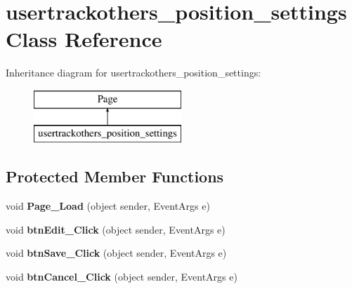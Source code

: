 \hypertarget{classusertrackothers__position__settings}{\section{usertrackothers\-\_\-position\-\_\-settings Class Reference}
\label{classusertrackothers__position__settings}
}
Inheritance diagram for usertrackothers\-\_\-position\-\_\-settings\-:\begin{figure}[H]
\begin{center}
\leavevmode
\includegraphics[height=2.000000cm]{classusertrackothers__position__settings}
\end{center}
\end{figure}
\subsection*{Protected Member Functions}
\begin{DoxyCompactItemize}
\item 
\hypertarget{classusertrackothers__position__settings_a8d16a41a67c8926bb09f5f3f149e29eb}{void {\bfseries Page\-\_\-\-Load} (object sender, Event\-Args e)}\label{classusertrackothers__position__settings_a8d16a41a67c8926bb09f5f3f149e29eb}

\item 
\hypertarget{classusertrackothers__position__settings_ab8f40e241f80bea7075fbdefe1561b5a}{void {\bfseries btn\-Edit\-\_\-\-Click} (object sender, Event\-Args e)}\label{classusertrackothers__position__settings_ab8f40e241f80bea7075fbdefe1561b5a}

\item 
\hypertarget{classusertrackothers__position__settings_af041fe3909a24b111515be9abbd27661}{void {\bfseries btn\-Save\-\_\-\-Click} (object sender, Event\-Args e)}\label{classusertrackothers__position__settings_af041fe3909a24b111515be9abbd27661}

\item 
\hypertarget{classusertrackothers__position__settings_aacdba5826f6038282aa673f9ffc87dfc}{void {\bfseries btn\-Cancel\-\_\-\-Click} (object sender, Event\-Args e)}\label{classusertrackothers__position__settings_aacdba5826f6038282aa673f9ffc87dfc}

\end{DoxyCompactItemize}


